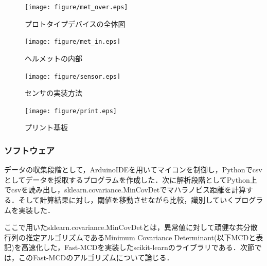 \documentclass[Japanese]{dicomopapers}
\begin{document}
\begin{figure}[!t]
  \begin{center}
    \texttt{[image: figure/met\_over.eps]}
  \end{center}
  \caption{プロトタイプデバイスの全体図}
  \label{met_over}
\end{figure}

\begin{figure}[!t]
  \begin{center}
    \texttt{[image: figure/met\_in.eps]}
  \end{center}
  \caption{ヘルメットの内部}
  \label{met_in}
\end{figure}

\begin{figure}[!t]
  \begin{center}
    \texttt{[image: figure/sensor.eps]}
  \end{center}
  \caption{センサの実装方法}
  \label{sensor}
\end{figure}

\begin{figure}[!t]
  \begin{center}
    \texttt{[image: figure/print.eps]}
  \end{center}
  \caption{プリント基板}
  \label{print}
\end{figure}

\subsubsection{ソフトウェア}
データの収集段階として，ArduinoIDEを用いてマイコンを制御し，Pythonでcsvとしてデータを採取するプログラムを作成した．次に解析段階としてPython上でcsvを読み出し，sklearn.covariance.MinCovDetでマハラノビス距離を計算する．そして計算結果に対し，閾値を移動させながら比較，識別していくプログラムを実装した．\par
ここで用いたsklearn.covariance.MinCovDetとは，異常値に対して頑健な共分散行列の推定アルゴリズムであるMinimum Covariance Determinant(以下MCDと表記)を高速化した，Fast-MCDを実装したscikit-learnのライブラリである．次節では，このFast-MCDのアルゴリズムについて論じる．
\end{document}
